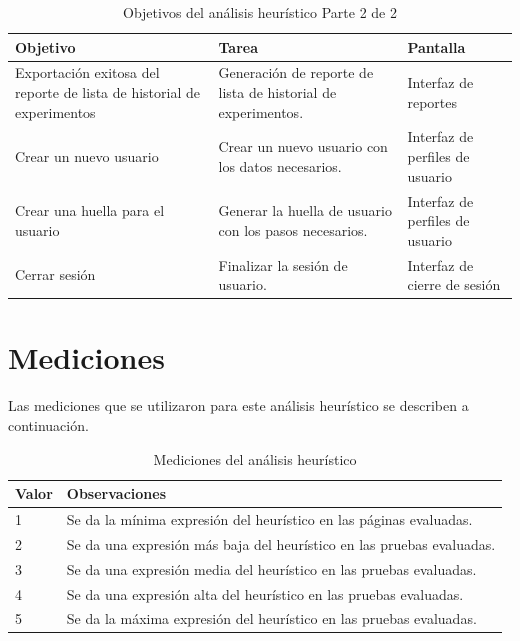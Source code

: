 \begin{table}[H]
\begin{center}
\begin{tabular}{||p{4cm}|p{6cm}|p{4cm}||}
\hline 
\cellcolor{lightgray}\textbf{Objetivo}
 & \cellcolor{lightgray}\textbf{Tarea}
 & \cellcolor{lightgray}\textbf{Pantalla} \\ \hline 
{Exportación exitosa del reporte de lista de historial de experimentos}&{Generación de reporte de lista de historial de experimentos.}&{Interfaz de reportes} \\ \hline 
{Crear un nuevo usuario}&{Crear un nuevo usuario con los datos necesarios.}&{Interfaz de perfiles de usuario} \\ \hline 
{Crear una huella para el usuario}&{Generar la huella de usuario con los pasos necesarios.}&{Interfaz de perfiles de usuario} \\ \hline 
{Cerrar sesión}&{Finalizar la sesión de usuario.}&{Interfaz de cierre de sesión} \\ \hline 

\end{tabular}

\caption{Objetivos del análisis heurístico Parte 2 de 2}
\label{XX22}
\end{center}
\end{table}

\section{Mediciones}

Las mediciones que se utilizaron para este análisis heurístico se describen a continuación.

\begin{table}[H]
\begin{center}
\begin{tabular}{||C{1cm}|p{13cm}||}
\hline 
{}\textbf{Valor}
 & \textbf{Observaciones} \\ \hline 

{1}&{Se da la mínima expresión del heurístico en las páginas evaluadas.} \\ \hline 
{2}&{Se da una expresión más baja del heurístico en las pruebas evaluadas.} \\ \hline 
{3}&{Se da una expresión media del heurístico en las pruebas evaluadas.} \\ \hline 
{4}&{Se da una expresión alta del heurístico en las pruebas evaluadas.} \\ \hline 
{5}&{Se da la máxima expresión del heurístico en las pruebas evaluadas.} \\ \hline

\end{tabular}

\caption{Mediciones del análisis heurístico}
\label{XX2}
\end{center}
\end{table}

